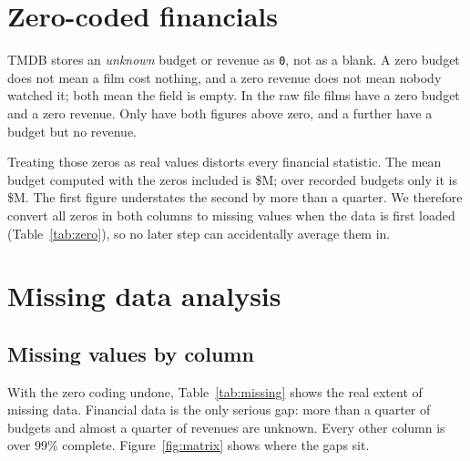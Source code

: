 \documentclass[a4paper,12pt]{report}
\newcommand{\code}[1]{\texttt{#1}}
\newcommand{\tablein}[1]{}
\begin{document}
\section{Zero-coded financials}

TMDB stores an \emph{unknown} budget or revenue as \code{0}, not as a blank. A zero budget does not mean a film cost nothing, and a zero revenue does not mean nobody watched it; both mean the field is empty. In the raw file \AuditZeroBudget{} films have a zero budget and \AuditZeroRevenue{} a zero revenue. Only \AuditBothFinancialsPositive{} have both figures above zero, and a further \AuditBudgetButZeroRevenue{} have a budget but no revenue.

Treating those zeros as real values distorts every financial statistic. The mean budget computed with the zeros included is \$\AuditMeanBudgetWithZerosM{}M; over recorded budgets only it is \$\AuditMeanBudgetPositiveOnlyM{}M. The first figure understates the second by more than a quarter. We therefore convert all zeros in both columns to missing values when the data is first loaded (Table~\ref{tab:zero}), so no later step can accidentally average them in.

\begin{table}[htbp]
\centering\small
\tablein{tab2_1_zero_conversion}
\caption{Converting zeros to missing values. Before conversion both columns look complete; afterwards the true gaps are visible.}
\label{tab:zero}
\end{table}

\section{Missing data analysis}

\subsection{Missing values by column}

With the zero coding undone, Table~\ref{tab:missing} shows the real extent of missing data. Financial data is the only serious gap: more than a quarter of budgets and almost a quarter of revenues are unknown. Every other column is over 99\% complete. Figure~\ref{fig:matrix} shows where the gaps sit.

\begin{table}[htbp]
\centering\small
\tablein{tab2_2_missing_by_column}
\caption{Missing values by column after zeros become missing values. Only the two financial columns have substantial gaps.}
\label{tab:missing}
\end{table}
\end{document}
